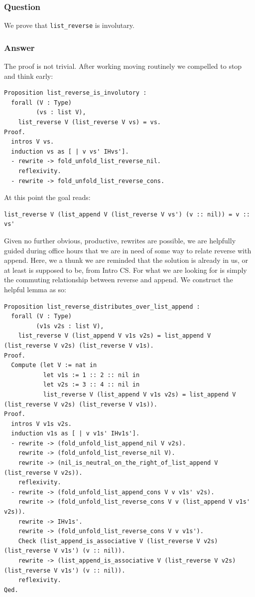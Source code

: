 \documentclass{article}
\begin{document}
\subsubsection{Question}
We prove that \texttt{list\_reverse} is involutary.

\subsubsection{Answer}
The proof is not trivial. After working moving routinely we compelled to stop and think early:

\begin{lstlisting}
Proposition list_reverse_is_involutory :
  forall (V : Type)
         (vs : list V),
    list_reverse V (list_reverse V vs) = vs.
Proof.
  intros V vs.
  induction vs as [ | v vs' IHvs'].
  - rewrite -> fold_unfold_list_reverse_nil.
    reflexivity.
  - rewrite -> fold_unfold_list_reverse_cons.
\end{lstlisting}  

At this point the goal reads:

\begin{lstlisting}
list_reverse V (list_append V (list_reverse V vs') (v :: nil)) = v :: vs'
\end{lstlisting}  

Given no further obvious, productive, rewrites are possible, we are helpfully guided during office hours that we are in need of some way to relate reverse with append. Here, we a thunk we are reminded that the solution is already in us, or at least is supposed to be, from Intro CS. For what we are looking for is simply the commuting relationship between reverse and append. We construct the helpful lemma as so:

\begin{lstlisting}
Proposition list_reverse_distributes_over_list_append :
  forall (V : Type)
         (v1s v2s : list V),
    list_reverse V (list_append V v1s v2s) = list_append V (list_reverse V v2s) (list_reverse V v1s).
Proof.
  Compute (let V := nat in
           let v1s := 1 :: 2 :: nil in
           let v2s := 3 :: 4 :: nil in
           list_reverse V (list_append V v1s v2s) = list_append V (list_reverse V v2s) (list_reverse V v1s)).
Proof.
  intros V v1s v2s.
  induction v1s as [ | v v1s' IHv1s'].
  - rewrite -> (fold_unfold_list_append_nil V v2s).  
    rewrite -> (fold_unfold_list_reverse_nil V).
    rewrite -> (nil_is_neutral_on_the_right_of_list_append V (list_reverse V v2s)).
    reflexivity.
  - rewrite -> (fold_unfold_list_append_cons V v v1s' v2s).
    rewrite -> (fold_unfold_list_reverse_cons V v (list_append V v1s' v2s)).
    rewrite -> IHv1s'.
    rewrite -> (fold_unfold_list_reverse_cons V v v1s').
    Check (list_append_is_associative V (list_reverse V v2s)(list_reverse V v1s') (v :: nil)). 
    rewrite -> (list_append_is_associative V (list_reverse V v2s)(list_reverse V v1s') (v :: nil)).
    reflexivity.
Qed.
\end{lstlisting}  
\end{document}
